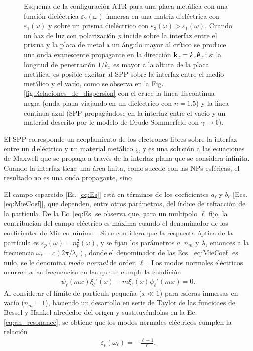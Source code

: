 \begin{figure}[h!]
\begin{tikzpicture}
\end{tikzpicture}	
	\caption{ Esquema de la configuración ATR para una placa metálica con una función dieléctrica $\varepsilon_2(\omega)$ inmersa en una matriz dieléctrica con $\varepsilon_1(\omega)$ y sobre un prisma dieléctrico con $\varepsilon_3(\omega)>\varepsilon_1(\omega)$. Cuando un haz de luz con polarización \emph{p} incide sobre la interfaz entre el prisma y la placa de metal a un ángulo mayor al crítico se produce una onda evanescente propagante en la dirección $\vb{k}_x=k_x\vu{e}_x$; si la longitud de penetración $1/k_x$ es mayor a la altura de la placa metálica, es posible excitar al SPP sobre la interfaz entre el medio metálico y el vacío, como se observa en la Fig. \ref{fig:Relaciones_de_dispersion} con el cruce la línea discontinua negra (onda plana viajando en un dieléctrico con $n=1.5$) y la línea continua azul (SPP propagándose en la interfaz entre el vacío y un material descrito por le modelo de Drude-Sommerfeld con $\gamma\to 0$).}
	\label{fig:ATR}
	\end{figure}
		
El SPP corresponde un acoplamiento de los electrones libres sobre la interfaz entre un dieléctrico y un material metálico ¿, y es una solución a las ecuaciones de Maxwell que se propaga a través de la interfaz plana que se considera infinita. Cuando la interfaz tiene una área finita, como sucede con las NPs esféricas, el resultado no es una onda propagante, sino 


	El campo esparcido [Ec.  \eqref{eq:Es}] está en términos de los coeficientes $a_\ell$ y $b_\ell$ [Ecs.  \eqref{eq:MieCoef}], que dependen, entre otros parámetros, del índice de refracción de la partícula.  De la Ec.  \eqref{eq:Es} se observa que, para un multipolo $\ell$ fijo, la contribución del campo eléctrico es máxima cuando el denominador de los coeficientes de Mie es mínimo \cite{novotny2006principles}.  Si se considera que la respuesta óptica de la partícula es 	$\varepsilon_p (\omega) = n_p^2 (\omega)$, y se fijan los parámetros $a$, $n_m$ y $\lambda$, 	entonces a la frecuencia $\omega_\ell = c (2\pi / \lambda_\ell)$, donde el denominador de las Ecs.  \eqref{eq:MieCoef} es nulo, se le denomina \emph{modo normal} de orden $\ell$ \cite{bohren1998absorption,maciel2017momentum}.  Los modos normales eléctricos ocurren a las frecuencias en las que se cumple la condición 
	\begin{align}
	\psi_\ell(mx)\xi_\ell'(x)-m\xi_\ell(x)\psi_\ell'(mx) = 0. 
	\label{eq:an_resonance}
	\end{align}
Al considerar el límite de partícula pequeña ($x\ll 1$) para esferas inmersas en vacío ($n_m=1$), haciendo un desarrollo en serie de Taylor de las funciones de Bessel y Hankel alrededor del origen y sustituyéndolas en la Ec.  \eqref{eq:an_resonance}, se obtiene que los modos normales eléctricos cumplen la relación \cite{maciel2017momentum}
	\begin{align}
	\varepsilon_p(\omega_\ell) = - \frac{\ell+1}{\ell}.  
	\label{eq:NormalModes}
	\end{align}

